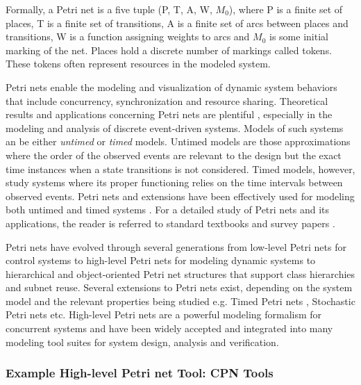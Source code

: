 Formally, a Petri net is a five tuple (P, T, A, W, $M_0$), where P is a finite set of places, T is a finite set of transitions, A is a finite set of arcs between places and transitions, W is a function assigning weights to arcs and $M_0$ is some initial marking of the net. Places hold a discrete number of markings called tokens. These tokens often represent resources in the modeled system.

Petri nets enable the modeling and visualization of dynamic system behaviors that include concurrency, synchronization and resource sharing. Theoretical results and applications concerning Petri nets are plentiful \cite{david1994petri, holloway1997survey}, especially in the modeling and analysis of discrete event-driven systems. Models of such systems an be either \emph{untimed} or \emph{timed} models. Untimed models are those approximations where the order of the observed events are relevant to the design but the exact time instances when a state transitions is not considered. Timed models, however, study systems where its proper functioning relies on the time intervals between observed events. Petri nets and extensions have been effectively used for modeling both untimed \cite{holloway1997survey} and timed systems \cite{zuberek1991timed}. For a detailed study of Petri nets and its applications, the reader is referred to standard textbooks \cite{peterson1977petri, reisig2012petri} and survey papers \cite{murata1989petri, zhou1999modeling, zurawski1994petri}.

Petri nets have evolved through several generations from low-level Petri nets for control systems \cite{reisig2012petri} to high-level Petri nets for modeling dynamic systems \cite{jensen2012high} to hierarchical and object-oriented Petri net structures \cite{de2001object} that support class hierarchies and subnet reuse. Several extensions to Petri nets exist, depending on the system model and the relevant properties being studied e.g. Timed Petri nets \cite{wang2012timed}, Stochastic Petri nets \cite{bause1996stochastic, marsan1994modelling} etc. High-level Petri nets are a powerful modeling formalism for concurrent systems and have been widely accepted and integrated into many modeling tool suites for system design, analysis and verification. 

\subsubsection{Example High-level Petri net Tool: CPN Tools}

